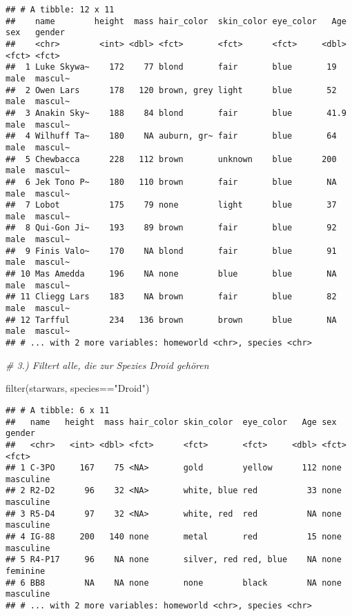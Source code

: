\documentclass[
]{book}
\newenvironment{Shaded}{\begin{snugshade}}{\end{snugshade}}
\newcommand{\CommentTok}[1]{\textcolor[rgb]{0.56,0.35,0.01}{\textit{#1}}}
\newcommand{\FunctionTok}[1]{\textcolor[rgb]{0.00,0.00,0.00}{#1}}
\newcommand{\NormalTok}[1]{#1}
\newcommand{\SpecialCharTok}[1]{\textcolor[rgb]{0.00,0.00,0.00}{#1}}
\newcommand{\StringTok}[1]{\textcolor[rgb]{0.31,0.60,0.02}{#1}}
\theoremstyle{definition}
\theoremstyle{definition}
\theoremstyle{definition}
\theoremstyle{definition}
\theoremstyle{remark}
\begin{document}
\begin{verbatim}
## # A tibble: 12 x 11
##    name        height  mass hair_color  skin_color eye_color   Age sex   gender 
##    <chr>        <int> <dbl> <fct>       <fct>      <fct>     <dbl> <fct> <fct>  
##  1 Luke Skywa~    172    77 blond       fair       blue       19   male  mascul~
##  2 Owen Lars      178   120 brown, grey light      blue       52   male  mascul~
##  3 Anakin Sky~    188    84 blond       fair       blue       41.9 male  mascul~
##  4 Wilhuff Ta~    180    NA auburn, gr~ fair       blue       64   male  mascul~
##  5 Chewbacca      228   112 brown       unknown    blue      200   male  mascul~
##  6 Jek Tono P~    180   110 brown       fair       blue       NA   male  mascul~
##  7 Lobot          175    79 none        light      blue       37   male  mascul~
##  8 Qui-Gon Ji~    193    89 brown       fair       blue       92   male  mascul~
##  9 Finis Valo~    170    NA blond       fair       blue       91   male  mascul~
## 10 Mas Amedda     196    NA none        blue       blue       NA   male  mascul~
## 11 Cliegg Lars    183    NA brown       fair       blue       82   male  mascul~
## 12 Tarfful        234   136 brown       brown      blue       NA   male  mascul~
## # ... with 2 more variables: homeworld <chr>, species <chr>
\end{verbatim}

\begin{Shaded}
\begin{Highlighting}[]
\CommentTok{\# 3.) Filtert alle, die zur Spezies Droid gehören}

\FunctionTok{filter}\NormalTok{(starwars, species}\SpecialCharTok{==}\StringTok{"Droid"}\NormalTok{)}
\end{Highlighting}
\end{Shaded}

\begin{verbatim}
## # A tibble: 6 x 11
##   name   height  mass hair_color skin_color  eye_color   Age sex   gender   
##   <chr>   <int> <dbl> <fct>      <fct>       <fct>     <dbl> <fct> <fct>    
## 1 C-3PO     167    75 <NA>       gold        yellow      112 none  masculine
## 2 R2-D2      96    32 <NA>       white, blue red          33 none  masculine
## 3 R5-D4      97    32 <NA>       white, red  red          NA none  masculine
## 4 IG-88     200   140 none       metal       red          15 none  masculine
## 5 R4-P17     96    NA none       silver, red red, blue    NA none  feminine 
## 6 BB8        NA    NA none       none        black        NA none  masculine
## # ... with 2 more variables: homeworld <chr>, species <chr>
\end{verbatim}
\end{document}
